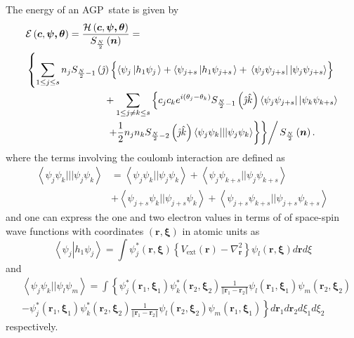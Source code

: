 \documentclass[aps,preprint]{revtex4}%
\begin{document}
The energy of an AGP\ state is given by
\begin{align}
&  \mathcal{E}\left(  \bm{c},\bm{\psi,\theta}\right)  =\frac{\mathcal{H}%
\left(  \bm{c},\bm{\psi,\theta}\right)  }{S_{\frac{N}{2}}\left(
\bm{n}\right)  }=\nonumber\\
&  \left\{  \sum_{1\leq j\leq s}n_{j}S_{\frac{N}{2}-1}\left(  \hat{\jmath
}\right)  \left\{  \overset{}{\left\langle \psi_{j}\left\vert h_{1}\psi
_{j}\right.  \right\rangle +\left\langle \psi_{j+s}\left\vert h_{1}\psi
_{j+s}\right.  \right\rangle }+\,\left\langle \psi_{j}\psi_{j+s}\right\vert
\left\vert \psi_{j}\psi_{j+s}\right\rangle \right\}  \right. \nonumber\\
&  \qquad\qquad\qquad\qquad+\sum_{1\leq j\neq k\leq s}\left\{  c_{j}%
c_{k}e^{i\left(  \theta_{j}-\theta_{k}\right)  }S_{\frac{N}{2}-1}\left(
\hat{\jmath}\hat{k}\right)  \left\langle \psi_{j}\psi_{j+s}\right\vert
\left\vert \psi_{k}\psi_{k+s}\right\rangle \right. \nonumber\\
&  \qquad\qquad\qquad\qquad\left.  \left.  \left.  +\frac{1}{2}\overset
{}{n_{j}n_{k}S_{\frac{N}{2}-2}\left(  \hat{\jmath}\hat{k}\right)  \left\langle
\psi_{j}\psi_{k}|||\psi_{j}\psi_{k}\right\rangle }\right\}  \right\}  \right/
S_{\frac{N}{2}}\left(  \bm{n}\right)  . \label{EnFunc}%
\end{align}
where the terms involving the coulomb interaction are defined as
\begin{align}
\left\langle \psi_{j}\psi_{k}|||\psi_{j}\psi_{k}\right\rangle  &
=\left\langle \psi_{j}\psi_{k}||\psi_{j}\psi_{k}\right\rangle +\left\langle
\psi_{j}\psi_{k+s}||\psi_{j}\psi_{k+s}\right\rangle \nonumber\\
&  +\left\langle \psi_{j+s}\psi_{k}||\psi_{j+s}\psi_{k}\right\rangle
+\left\langle \psi_{j+s}\psi_{k+s}||\psi_{j+s}\psi_{k+s}\right\rangle
\end{align}
and one can express the one and two electron values in terms of of space-spin
wave functions with coordinates $\left(  \bm{r,\xi}\right)  $ in atomic units
as
\begin{equation}
\left\langle \psi_{j}\left\vert h_{1}\psi_{j}\right.  \right\rangle =\int
\psi_{j}^{\ast}\left(  \bm{r,\xi}\right)  \left\{  V_{\text{ext}}\left(
\bm{r}\right)  -\nabla_{\bm{r}}^{2}\right\}  \psi_{l}\left(
\bm{r,\xi}\right)  d\bm{r}d\xi
\end{equation}
and
\begin{align}
&  \left\langle \psi_{j}\psi_{k}||\psi_{l}\psi_{m}\right\rangle =\int\left\{
\psi_{j}^{\ast}\left(  \bm{r}_{1}\bm{,\xi}_{1}\right)  \psi_{k}^{\ast}\left(
\bm{r}_{2}\bm{,\xi}_{2}\right)  \frac{1}{\left\Vert \bm{r}_{1}-\bm{r}_{2}%
\right\Vert }\psi_{l}\left(  \bm{r}_{1}\bm{,\xi}_{1}\right)  \psi_{m}\left(
\bm{r}_{2}\bm{,\xi}_{2}\right)  \right. \nonumber\\
&  -\left.  \psi_{j}^{\ast}\left(  \bm{r}_{1}\bm{,\xi}_{1}\right)  \psi
_{k}^{\ast}\left(  \bm{r}_{2}\bm{,\xi}_{2}\right)  \frac{1}{\left\Vert
\bm{r}_{1}-\bm{r}_{2}\right\Vert }\psi_{l}\left(  \bm{r}_{2}\bm{,\xi}_{2}%
\right)  \psi_{m}\left(  \bm{r}_{1}\bm{,\xi}_{1}\right)  \right\}
d\bm{r}_{1}d\bm{r}_{2}d\xi_{1}d\xi_{2}%
\end{align}
respectively.
\end{document}
